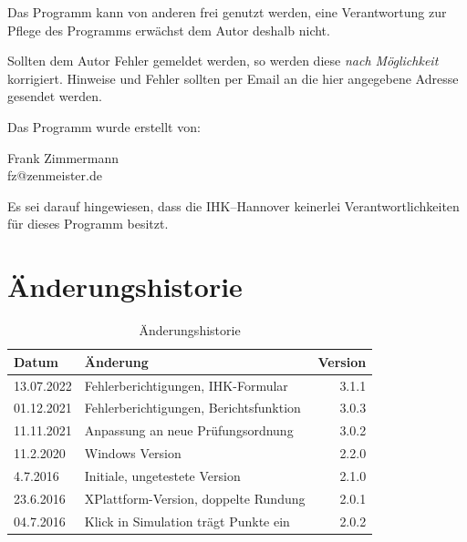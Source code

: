 \documentclass[a4paper,notitlepage,parskip=half]{scrartcl}
\begin{document}
Das Programm kann von anderen frei genutzt werden, eine Verantwortung zur Pflege des Programms erwächst dem Autor deshalb nicht.

Sollten dem Autor Fehler gemeldet werden, so werden diese \emph{nach Möglichkeit} korrigiert. Hinweise und Fehler sollten per Email an die hier angegebene Adresse gesendet werden.

Das Programm wurde erstellt von:

Frank Zimmermann\\
fz@zenmeister.de

Es sei darauf hingewiesen, dass die IHK--Hannover keinerlei Verantwortlichkeiten für dieses Programm besitzt.
\section{Änderungshistorie}
\begin{table}[H]\centering
\begin{tabular}{|l|l|r|}
\hline
Datum & Änderung &Version\\
\hline
13.07.2022& Fehlerberichtigungen, IHK-Formular      &  3.1.1\\
01.12.2021& Fehlerberichtigungen, Berichtsfunktion  &  3.0.3\\
11.11.2021& Anpassung an neue Prüfungsordnung       &  3.0.2\\
11.2.2020 &	Windows Version						    &  2.2.0\\
4.7.2016  &	Initiale, ungetestete Version		    &  2.1.0\\
23.6.2016 &	XPlattform-Version, doppelte Rundung    &  2.0.1\\
04.7.2016 &	Klick in Simulation trägt Punkte ein    &  2.0.2\\
\hline
\end{tabular}
\caption{Änderungshistorie}
\end{table}
\end{document}
